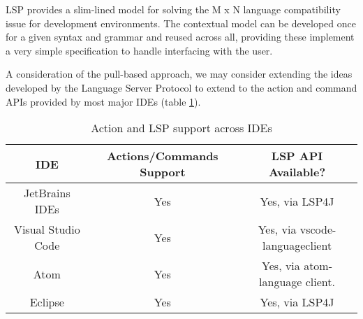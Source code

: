 LSP provides a slim-lined model for solving the M x N language compatibility issue for development environments. The contextual model can be developed once for a given syntax and grammar and reused across all, providing these implement a very simple specification to handle interfacing with the user.

A consideration of the pull-based approach, we may consider extending the ideas developed by the Language Server Protocol to extend to the action and command APIs provided by most major IDEs (table \ref{table:1}).

\begin{table}[h!]
	\centering
	\begin{tabular}{ | c | c | c |}
		\hline
		IDE & Actions/Commands Support & LSP API Available?\\
		\hline
		\hline
		JetBrains IDEs & Yes & Yes, via LSP4J\\ 
		Visual Studio Code & Yes & Yes, via vscode-languageclient \\
		Atom & Yes & Yes, via atom-language client.\\
		Eclipse & Yes & Yes, via LSP4J\\
		\hline
	\end{tabular}
	\caption{Action and LSP support across IDEs}
	\label{table:1}
\end{table}
